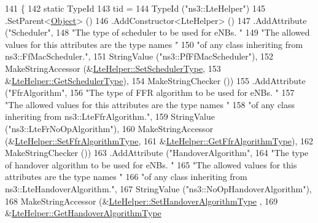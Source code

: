 \begin{DoxyCode}
141 \{
142   \textcolor{keyword}{static} TypeId
143     tid =
144     TypeId (\textcolor{stringliteral}{"ns3::LteHelper"})
145     .SetParent<\hyperlink{classns3_1_1Object_a40860402e64d8008fb42329df7097cdb}{Object}> ()
146     .AddConstructor<LteHelper> ()
147     .AddAttribute (\textcolor{stringliteral}{"Scheduler"},
148                    \textcolor{stringliteral}{"The type of scheduler to be used for eNBs. "}
149                    \textcolor{stringliteral}{"The allowed values for this attributes are the type names "}
150                    \textcolor{stringliteral}{"of any class inheriting from ns3::FfMacScheduler."},
151                    StringValue (\textcolor{stringliteral}{"ns3::PfFfMacScheduler"}),
152                    MakeStringAccessor (&\hyperlink{classns3_1_1LteHelper_a8f86e55b8b80a81732c4b2df00fb25d5}{LteHelper::SetSchedulerType},
153                                        &\hyperlink{classns3_1_1LteHelper_a473e6182ffe9f7b174aa3f149bd5e205}{LteHelper::GetSchedulerType}),
154                    MakeStringChecker ())
155     .AddAttribute (\textcolor{stringliteral}{"FfrAlgorithm"},
156                    \textcolor{stringliteral}{"The type of FFR algorithm to be used for eNBs. "}
157                    \textcolor{stringliteral}{"The allowed values for this attributes are the type names "}
158                    \textcolor{stringliteral}{"of any class inheriting from ns3::LteFfrAlgorithm."},
159                    StringValue (\textcolor{stringliteral}{"ns3::LteFrNoOpAlgorithm"}),
160                    MakeStringAccessor (&\hyperlink{classns3_1_1LteHelper_a035c6b03305c1511975362f80425b5fc}{LteHelper::SetFfrAlgorithmType},
161                                        &\hyperlink{classns3_1_1LteHelper_a4512795e75ecff30e9eeca0d26589614}{LteHelper::GetFfrAlgorithmType}),
162                    MakeStringChecker ())
163     .AddAttribute (\textcolor{stringliteral}{"HandoverAlgorithm"},
164                    \textcolor{stringliteral}{"The type of handover algorithm to be used for eNBs. "}
165                    \textcolor{stringliteral}{"The allowed values for this attributes are the type names "}
166                    \textcolor{stringliteral}{"of any class inheriting from ns3::LteHandoverAlgorithm."},
167                    StringValue (\textcolor{stringliteral}{"ns3::NoOpHandoverAlgorithm"}),
168                    MakeStringAccessor (&\hyperlink{classns3_1_1LteHelper_a6301630b8a7082043efff2a7aaaa1d20}{LteHelper::SetHandoverAlgorithmType}
      ,
169                                        &\hyperlink{classns3_1_1LteHelper_a36c21827cb5935020858e0c0f6db4472}{LteHelper::GetHandoverAlgorithmType}

\end{DoxyCode}
